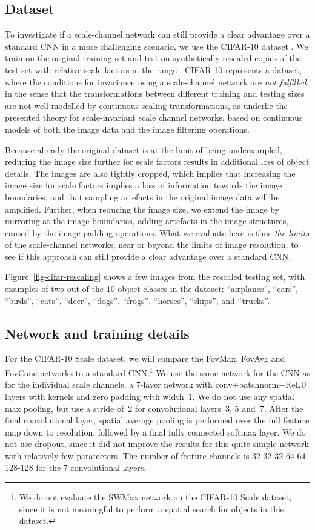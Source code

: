 \documentclass[twocolumn,runningheads]{svjour3}
\begin{document}
\subsection{Dataset}
\label{sec:cifar-scale}

To investigate if a scale-channel network can still provide a clear advantage over a standard CNN in a more challenging scenario, we use the CIFAR-10 dataset \cite{KriHin09-CIFAR}. We train on the original training set and test on synthetically rescaled copies of the test set with relative scale factors in the range .
CIFAR-10 represents a dataset, where the
conditions for invariance using a scale-channel network are \emph{not
fulfilled}, in the sense that the transformations between different training and
testing sizes are not well modelled by continuous scaling
transformations, as underlie the presented theory for scale-invariant scale
channel networks, based on continuous models of both the image data
and the image filtering operations. 

Because already the original dataset is at the limit of being
undersampled, reducing the image size further for scale factors  
results in additional loss of object details. 
The images are also tightly cropped, which implies that
increasing the image size for scale factors  implies a
loss of information towards the image boundaries, and that
sampling artefacts in the original image
data will be amplified.
Further, when reducing the image size, we extend the image by mirroring at the image boundaries, adding artefacts in the image structures, caused by the image padding operations. What we evaluate here is thus \emph{the limits} of the scale-channel networks, near or beyond the
limits of image resolution, to see if this approach can still provide a clear advantage over a standard CNN. 

Figure~\ref{fig-cifar-rescaling} shows a few images from the rescaled testing set,
with examples of two out of the 10 object classes in the dataset:
``airplanes'', ``cars'', ``birds'', ``cats'', ``deer'', ``dogs'',
``frogs'', ``horses'', ``ships'', and ``trucks''.

\subsection{Network and training details}

For the CIFAR-10 Scale dataset, we will compare the FovMax, FovAvg and
FovConc networks to a standard CNN.\footnote{We do not evaluate the SWMax
network on the CIFAR-10 Scale dataset, since it is not meaningful to
perform a spatial search for objects in this dataset.}
We use the same network for the CNN as for the individual scale channels, a 7-layer network with
conv+batchnorm+ReLU layers with   kernels and zero padding with width~1. We do not use any spatial max pooling, but use a stride of~2 for convolutional layers~3, 5 and~7.
After the final convolutional layer, spatial average pooling is performed over the full feature map down to  resolution, followed by a final fully connected softmax layer.
We do not use dropout, since it did not improve the results for this quite simple network with relatively few parameters. The number of feature channels is 32-32-32-64-64-128-128 for the 7 convolutional layers.
\end{document}
